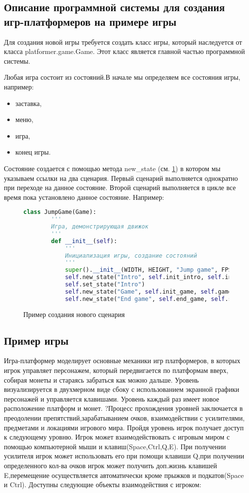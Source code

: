 \subsection{Описание программной системы для создания игр-платформеров на примере игры}

Для создания новой игры требуется создать класс игры, который наследуется от класса platformer.game.Game. Этот класс является главной частью программной системы.

Любая игра состоит из состояний.В начале мы определяем все состояния игры, например:
\begin{itemize}
	\item заставка,
	\item меню,
	\item игра,
	\item конец игры.
\end{itemize}

Состояние создается с помощью метода new\_state (см. \ref{state:imgage}) в котором мы указываем ссылки на два сценария. Первый сценарий выполняется однократно при переходе на данное состояние. Второй сценарий выполняется в цикле все время пока установлено данное состояние. Например:

\begin{figure}[H]
	\begin{lstlisting}[language=Python]
	class JumpGame(Game):
		'''
		Игра, демонстрирующая движок
		'''
		def __init__(self):
			'''
			Инициализация игры, создание состояний
			'''
			super().__init__(WIDTH, HEIGHT, "Jump game", FPS)
			self.new_state("Intro", self.init_intro, self.intro)
			self.set_state("Intro")
			self.new_state("Game", self.init_game, self.game_script)
			self.new_state("End game", self.end_game, self.start_new_game)
	\end{lstlisting}
	\caption{Пример создания нового сценария}
	\label{state:imgage}
\end{figure}



\subsection{Пример игры}

Игра-платформер моделирует основные механики игр платформеров, в которых игрок управляет персонажем, который передвигается по платформам вверх, собирая монеты и стараясь забраться как можно дальше. Уровень визуализируется в двухмерном виде сбоку с использованием экранной графики персонажей и управляется клавишами. Уровень каждый раз имеет новое расположение платформ и монет.
?Процесс прохождения уровней заключается в преодолении препятствий,зарабатыванием очков, взаимодействии с усилителями, предметами и локациями игрового мира. Пройдя уровень игрок получает доступ к следующему уровню. Игрок может взаимодействовать с игровым миром с помощью компьютерной мыши и клавиш(Space,Ctrl,Q,E). При получении усилителя игрок может использовать его при помощи клавиши Q,при получении определенного кол-ва очков игрок может получить доп.жизнь клавишей E,перемещение осуществляется автоматически кроме прыжков и подкатов(Space и Ctrl). Доступны следующие объекты взаимодействия с игроком:


